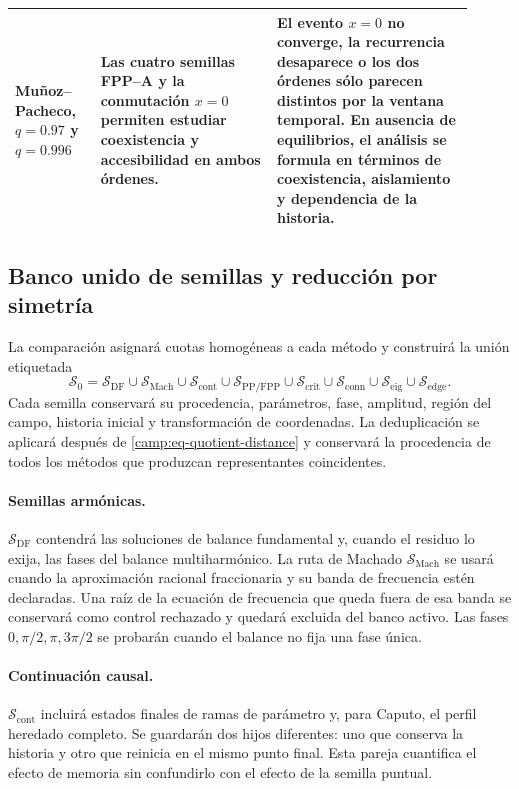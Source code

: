 \begin{longtable}{@{}p{0.17\linewidth}p{0.35\linewidth}p{0.39\linewidth}@{}}
Muñoz--Pacheco, \(q=0.97\) y \(q=0.996\)
& Las cuatro semillas FPP--A y la conmutación \(x=0\) permiten estudiar
  coexistencia y accesibilidad en ambos órdenes.
& El evento \(x=0\) no converge, la recurrencia desaparece o los dos órdenes
  sólo parecen distintos por la ventana temporal. En ausencia de equilibrios,
  el análisis se formula en términos de coexistencia, aislamiento y dependencia
  de la historia.\\
\bottomrule
\end{longtable}

\subsection{Banco unido de semillas y reducción por simetría}
\label{camp:banco-semillas}

La comparación asignará cuotas homogéneas a cada método y construirá la unión
etiquetada
\begin{equation}
 \mathcal S_0=
 \mathcal S_{\mathrm{DF}}
 \cup\mathcal S_{\mathrm{Mach}}
 \cup\mathcal S_{\mathrm{cont}}
 \cup\mathcal S_{\mathrm{PP/FPP}}
 \cup\mathcal S_{\mathrm{crit}}
 \cup\mathcal S_{\mathrm{conn}}
 \cup\mathcal S_{\mathrm{eig}}
 \cup\mathcal S_{\mathrm{edge}}.
 \label{camp:eq-seed-union}
\end{equation}
Cada semilla conservará su procedencia, parámetros, fase, amplitud, región del
campo, historia inicial y transformación de coordenadas. La deduplicación se
aplicará después de \cref{camp:eq-quotient-distance} y conservará la procedencia
de todos los métodos que produzcan representantes coincidentes.

\paragraph{Semillas armónicas.}
\(\mathcal S_{\mathrm{DF}}\) contendrá las soluciones de balance fundamental y,
cuando el residuo lo exija, las fases del balance multiharmónico. La ruta de
Machado \(\mathcal S_{\mathrm{Mach}}\) se usará cuando la aproximación racional
fraccionaria y su banda de frecuencia estén declaradas. Una raíz de la
ecuación de frecuencia que queda fuera de esa banda se conservará como control
rechazado y quedará excluida del banco activo. Las fases \(0,\pi/2,\pi,3\pi/2\) se
probarán cuando el balance no fija una fase única.

\paragraph{Continuación causal.}
\(\mathcal S_{\mathrm{cont}}\) incluirá estados finales de ramas de parámetro y,
para Caputo, el perfil heredado completo. Se guardarán dos hijos diferentes:
uno que conserva la historia y otro que reinicia en el mismo punto final. Esta
pareja cuantifica el efecto de memoria sin confundirlo con el efecto de la
semilla puntual.

